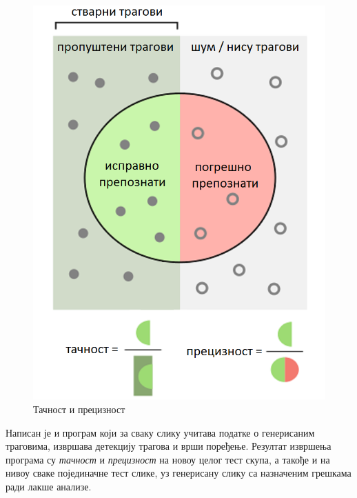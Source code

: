 \documentclass[11pt,a4paper,serbian,oneside]{book}
\begin{document}
\begin{figure}[H]
\begin{center}
\includegraphics[width=120mm]{images/recall_prec.png}
\end{center}
\caption{Тачност и прецизност}
\label{fig:recall_prec}
\end{figure}

Написан је и програм који за сваку слику учитава податке о генерисаним траговима, извршава детекцију трагова и врши поређење. Резултат извршења програма су \textit{тачност} и \textit{прецизност} на новоу целог тест скупа, а такође и на нивоу сваке појединачне тест слике, уз генерисану слику са назначеним грешкама ради лакше анализе.
\end{document}
